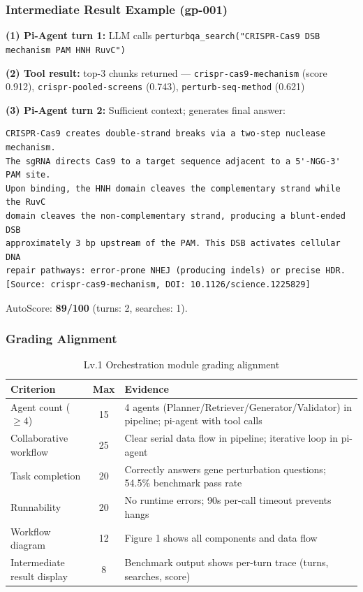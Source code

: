 \documentclass[12pt, a4paper]{article}
\begin{document}
\subsubsection{Intermediate Result Example (gp-001)}

\textbf{(1) Pi-Agent turn 1:} LLM calls \texttt{perturbqa\_search("CRISPR-Cas9 DSB mechanism PAM HNH RuvC")}

\textbf{(2) Tool result:} top-3 chunks returned — \texttt{crispr-cas9-mechanism} (score 0.912),
\texttt{crispr-pooled-screens} (0.743), \texttt{perturb-seq-method} (0.621)

\textbf{(3) Pi-Agent turn 2:} Sufficient context; generates final answer:

\begin{lstlisting}[caption={Pi-agent final answer excerpt (gp-001, score 89)}]
CRISPR-Cas9 creates double-strand breaks via a two-step nuclease mechanism.
The sgRNA directs Cas9 to a target sequence adjacent to a 5'-NGG-3' PAM site.
Upon binding, the HNH domain cleaves the complementary strand while the RuvC
domain cleaves the non-complementary strand, producing a blunt-ended DSB
approximately 3 bp upstream of the PAM. This DSB activates cellular DNA
repair pathways: error-prone NHEJ (producing indels) or precise HDR.
[Source: crispr-cas9-mechanism, DOI: 10.1126/science.1225829]
\end{lstlisting}

AutoScore: \textbf{89/100} (turns: 2, searches: 1).

\subsubsection{Grading Alignment}

\begin{table}[ht]
\centering
\caption{Lv.1 Orchestration module grading alignment}
\begin{tabular}{lcp{7cm}}
\toprule
\textbf{Criterion} & \textbf{Max} & \textbf{Evidence} \\
\midrule
Agent count ($\ge4$)        & 15 & 4 agents (Planner/Retriever/Generator/Validator) in pipeline; pi-agent with tool calls \\
Collaborative workflow       & 25 & Clear serial data flow in pipeline; iterative loop in pi-agent \\
Task completion              & 20 & Correctly answers gene perturbation questions; 54.5\% benchmark pass rate \\
Runnability                  & 20 & No runtime errors; 90s per-call timeout prevents hangs \\
Workflow diagram             & 12 & Figure 1 shows all components and data flow \\
Intermediate result display  &  8 & Benchmark output shows per-turn trace (turns, searches, score) \\
\bottomrule
\end{tabular}
\end{table}
\end{document}
